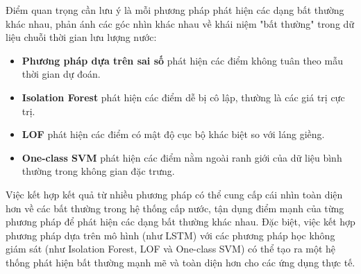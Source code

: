 Điểm quan trọng cần lưu ý là mỗi phương pháp phát hiện các dạng bất thường khác nhau, phản ánh các góc nhìn khác nhau về khái niệm "bất thường" trong dữ liệu chuỗi thời gian lưu lượng nước:

\begin{itemize}
    \item \textbf{Phương pháp dựa trên sai số} phát hiện các điểm không tuân theo mẫu thời gian dự đoán.
    \item \textbf{Isolation Forest} phát hiện các điểm dễ bị cô lập, thường là các giá trị cực trị.
    \item \textbf{LOF} phát hiện các điểm có mật độ cục bộ khác biệt so với láng giềng.
    \item \textbf{One-class SVM} phát hiện các điểm nằm ngoài ranh giới của dữ liệu bình thường trong không gian đặc trưng.
\end{itemize}

Việc kết hợp kết quả từ nhiều phương pháp có thể cung cấp cái nhìn toàn diện hơn về các bất thường trong hệ thống cấp nước, tận dụng điểm mạnh của từng phương pháp để phát hiện các dạng bất thường khác nhau. Đặc biệt, việc kết hợp phương pháp dựa trên mô hình (như LSTM) với các phương pháp học không giám sát (như Isolation Forest, LOF và One-class SVM) có thể tạo ra một hệ thống phát hiện bất thường mạnh mẽ và toàn diện hơn cho các ứng dụng thực tế.
